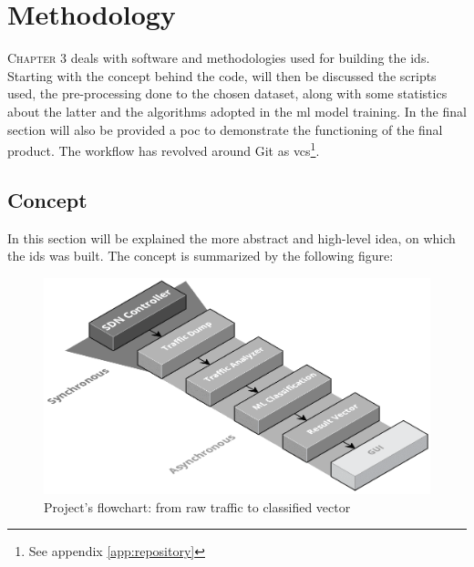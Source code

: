 \chapter{Methodology}
\label{chap:methodology}

\lettrine[lines=3, findent=3pt, nindent=0pt]{C}{hapter} 3 deals with software and methodologies used for building the \gls{ids}. Starting with the concept behind the code, will then be discussed the scripts used, the pre-processing done to the chosen dataset, along with some statistics about the latter and the algorithms adopted in the \gls{ml} model training. In the final section will also be provided a \gls{poc} to demonstrate the functioning of the final product. The workflow has revolved around Git as \gls{vcs}\footnote{See appendix \ref{app:repository}}.


\section{Concept}
\label{sec:concept}

In this section will be explained the more abstract and high-level idea, on which the \gls{ids} was built. The concept is summarized by the following figure:

\begin{figure}[h!]
    \centering
    \includegraphics[scale=0.32]{assets/figures/chapter3/concept-components.png}
    \caption{Project's flowchart: from raw traffic to classified vector}
    \label{fig:concept-components}
\end{figure}


